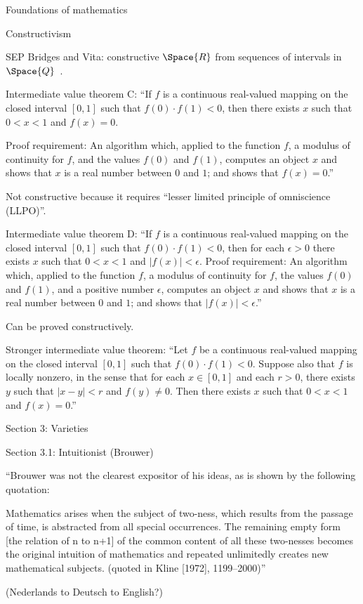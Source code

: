 \begin{plSection}{Foundations of mathematics}
\begin{plSection}{Constructivism}
\begin{plSection}{SEP}
Bridges and Vita: constructive $\Space{R}$ from sequences
of intervals in $\Space{Q}$~\cite{Bridger:2019}.

Intermediate value theorem C: 
``If $f$ is a continuous real-valued mapping 
on the closed interval $[0,1]$ such that $f(0)⋅f(1)<0$, 
then there exists $x$ such that $0<x<1$ and $f(x)=0$.

Proof requirement: 
An algorithm which, applied to the function $f$, 
a modulus of continuity for $f$, and the values $f(0)$ and $f(1)$,
computes an object $x$ and shows that $x$ is a real number 
between $0$ and $1$; and
shows that $f(x)=0$.''~\cite{sep:ConstructiveMathematics}

Not constructive because it requires
``lesser limited principle of omniscience (LLPO)''.

Intermediate value theorem D:
``If $f$ is a continuous real-valued mapping 
on the closed interval $[0,1]$ 
such that $f(0)⋅f(1)<0$, 
then for each $\epsilon>0$ 
there exists $x$ such that $0<x<1$ and $|f(x)|<\epsilon$.
Proof requirement: 
An algorithm which, applied to the function $f$, 
a modulus of continuity for $f$, the values $f(0)$ and $f(1)$, 
and a positive number $\epsilon$,
computes an object $x$ 
and shows that $x$ is a real number between $0$ and $1$; and
shows that $|f(x)|<\epsilon$.''~\cite{sep:ConstructiveMathematics}

Can be proved constructively.

Stronger intermediate value theorem:
``Let $f$ be a continuous real-valued mapping 
on the closed interval $[0,1]$ 
such that $f(0)⋅f(1)<0$. 
Suppose also that $f$ is locally nonzero, 
in the sense that for each $x \in [0,1]$
and each $r>0$, 
there exists $y$ such that $|x−y|<r$ and $f(y) \neq 0$. 
Then there exists $x$ such that $0<x<1$ and $f(x)=0$.''

Section 3: Varieties

Section 3.1: Intuitionist (Brouwer)

``Brouwer was not the clearest expositor of his ideas, 
as is shown by the following quotation:

Mathematics arises when the subject of two-ness, 
which results from the passage of time, 
is abstracted from all special occurrences. 
The remaining empty form [the relation of n to n+1] 
of the common content of all these two-nesses 
becomes the original intuition of mathematics 
and repeated unlimitedly creates new mathematical subjects. 
(quoted in Kline [1972], 1199–2000)''

(Nederlands to Deutsch to English?)


\end{plSection}
\end{plSection}
\end{plSection}
